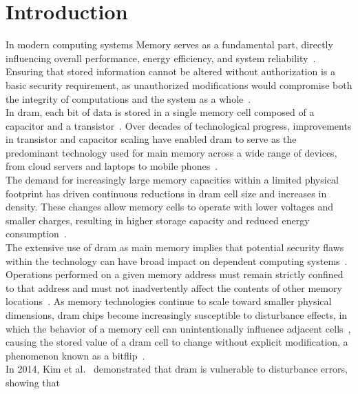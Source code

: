 \section{Introduction} \label{sec:introduction}
  In modern computing systems Memory serves as a fundamental part, directly influencing overall 
  performance, energy efficiency, and system reliability~\cite{paperRHARetrospective}. Ensuring that stored information 
  cannot be altered without authorization is a basic security requirement, as unauthorized 
  modifications would compromise both the integrity of computations and the system as a whole~\cite{paperTriggeringRHHardwareFault}.
  \\
  In \gls{dram}, each bit of data is stored in a single memory cell composed of a capacitor and a 
  transistor~\cite{paperRowhammeronaRPi}. Over decades of technological progress, improvements in transistor and capacitor 
  scaling have enabled \gls{dram} to serve as the predominant technology used for main memory across a wide 
  range of devices, from cloud servers and laptops to mobile phones~\cite{paperOnDRAM}.
  \\
  The demand for increasingly large memory capacities within a limited physical footprint has driven 
  continuous reductions in \gls{dram} cell size and increases in density. These changes allow memory cells 
  to operate with lower voltages and smaller charges, resulting in higher storage capacity and reduced 
  energy consumption~\cite{paperAnotherFlip}.
  \\
  The extensive use of \gls{dram} as main memory implies that potential security flaws within the technology 
  can have broad impact on dependent computing systems~\cite{paperOnDRAM}. Operations performed on a given memory 
  address must remain strictly confined to that address and must not inadvertently affect the contents 
  of other memory locations~\cite{paperRHARetrospective}. As memory technologies continue to scale toward smaller physical 
  dimensions, \gls{dram} chips become increasingly susceptible to disturbance effects, in which the behavior 
  of a memory cell can unintentionally influence adjacent cells~\cite{paperRHARetrospective}, causing the stored value of a 
  \gls{dram} cell to change without explicit modification, a phenomenon known as a bitflip~\cite{paperAnotherFlip}.
  \\
  In 2014, Kim et al.~\cite{paperFlippingBits} demonstrated that \gls{dram} is vulnerable to disturbance errors, showing that 
